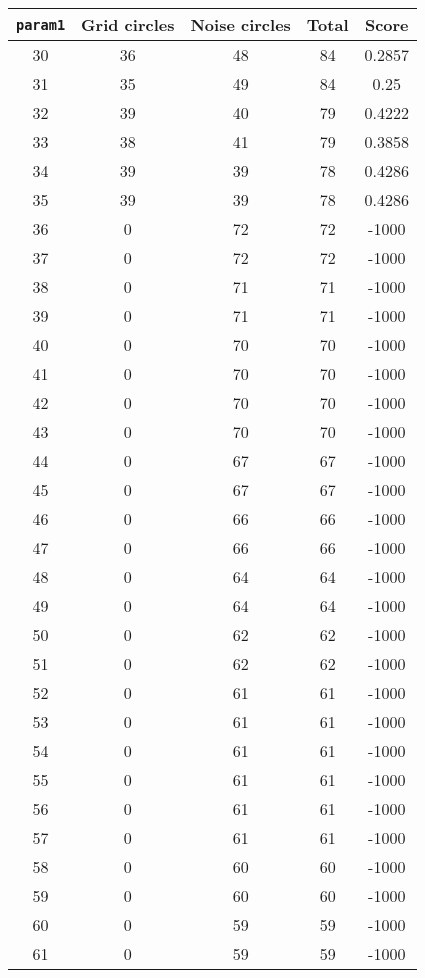 \documentclass[letterpaper, 12pt]{article}
\begin{document}
\begin{longtable}{|c|c|c|c|c|}
\hline
\textbf{\texttt{param1}} & \textbf{Grid circles} & \textbf{Noise circles} & \textbf{Total} & \textbf{Score} \\
\hline
30 & 36 & 48 & 84 & 0.2857 \\
\hline
31 & 35 & 49 & 84 & 0.25 \\
\hline
32 & 39 & 40 & 79 & 0.4222 \\
\hline
33 & 38 & 41 & 79 & 0.3858 \\
\hline
34 & 39 & 39 & 78 & 0.4286 \\
\hline
35 & 39 & 39 & 78 & 0.4286 \\
\hline
36 & 0 & 72 & 72 & -1000 \\
\hline
37 & 0 & 72 & 72 & -1000 \\
\hline
38 & 0 & 71 & 71 & -1000 \\
\hline
39 & 0 & 71 & 71 & -1000 \\
\hline
40 & 0 & 70 & 70 & -1000 \\
\hline
41 & 0 & 70 & 70 & -1000 \\
\hline
42 & 0 & 70 & 70 & -1000 \\
\hline
43 & 0 & 70 & 70 & -1000 \\
\hline
44 & 0 & 67 & 67 & -1000 \\
\hline
45 & 0 & 67 & 67 & -1000 \\
\hline
46 & 0 & 66 & 66 & -1000 \\
\hline
47 & 0 & 66 & 66 & -1000 \\
\hline
48 & 0 & 64 & 64 & -1000 \\
\hline
49 & 0 & 64 & 64 & -1000 \\
\hline
50 & 0 & 62 & 62 & -1000 \\
\hline
51 & 0 & 62 & 62 & -1000 \\
\hline
52 & 0 & 61 & 61 & -1000 \\
\hline
53 & 0 & 61 & 61 & -1000 \\
\hline
54 & 0 & 61 & 61 & -1000 \\
\hline
55 & 0 & 61 & 61 & -1000 \\
\hline
56 & 0 & 61 & 61 & -1000 \\
\hline
57 & 0 & 61 & 61 & -1000 \\
\hline
58 & 0 & 60 & 60 & -1000 \\
\hline
59 & 0 & 60 & 60 & -1000 \\
\hline
60 & 0 & 59 & 59 & -1000 \\
\hline
61 & 0 & 59 & 59 & -1000 \\

\end{longtable}
\end{document}
